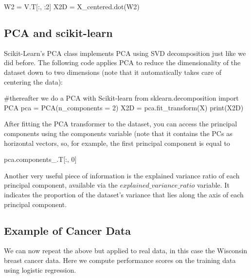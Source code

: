 \documentclass[%
oneside,                 %
final,                   %
10pt]{article}
\begin{document}
\bpycod
W2 = V.T[:, :2]
X2D = X_centered.dot(W2)

\epycod


\subsection{PCA and scikit-learn}

Scikit-Learn’s PCA class implements PCA using SVD decomposition just like we did before. The
following code applies PCA to reduce the dimensionality of the dataset down to two dimensions (note
that it automatically takes care of centering the data):






\bpycod
#thereafter we do a PCA with Scikit-learn
from sklearn.decomposition import PCA
pca = PCA(n_components = 2)
X2D = pca.fit_transform(X)
print(X2D)

\epycod

After fitting the PCA transformer to the dataset, you can access the principal components using the
components variable (note that it contains the PCs as horizontal vectors, so, for example, the first
principal component is equal to 


\bpycod
pca.components_.T[:, 0]

\epycod

Another very useful piece of information is the explained variance ratio of each principal component,
available via the $explained\_variance\_ratio$ variable. It indicates the proportion of the dataset’s
variance that lies along the axis of each principal component. 

\subsection{Example of Cancer Data}
We can now repeat the above but applied to real data, in this case the Wisconsin breast cancer data.
Here we compute performance scores on the training data using logistic regression.
\end{document}
